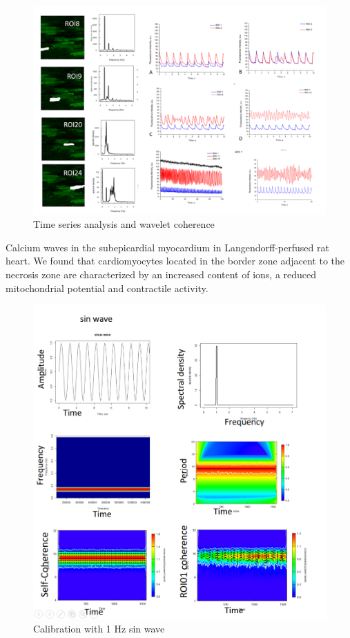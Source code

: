 \documentclass{biophys-new}
\begin{document}
\begin{figure}
    \includegraphics[width=0.9\linewidth]{fig4.png}
    \caption{Time series analysis and wavelet coherence}
    \label{fig:fig4}
\end{figure}



Calcium waves in the subepicardial myocardium in Langendorff-perfused rat heart.
We found that cardiomyocytes located in the border zone adjacent to the necrosis zone are characterized by an increased content of  ions, a reduced mitochondrial potential and contractile activity.


\begin{figure}[hbt!]
\centering
\includegraphics[width=0.6\linewidth]{fig6.png}
\caption{Calibration with 1 Hz sin wave}
\label{fig:fig6}
\end{figure}
\end{document}
